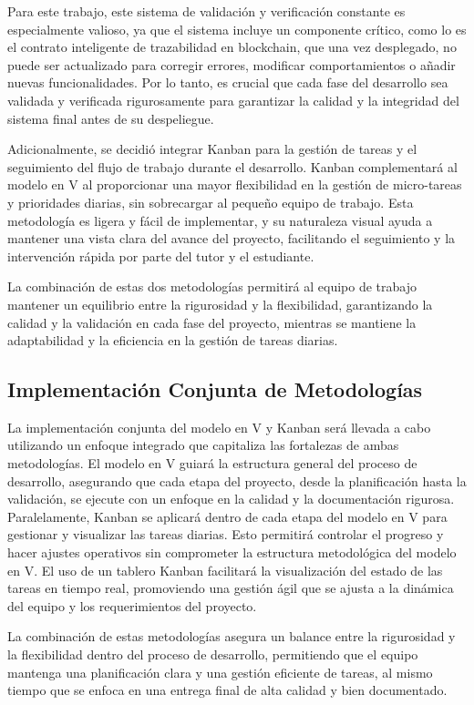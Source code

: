 Para este trabajo, este sistema de validación y verificación constante es especialmente valioso, ya que el sistema incluye un componente crítico, como lo es el contrato inteligente de trazabilidad en blockchain, que una vez desplegado, no puede ser actualizado para corregir errores, modificar comportamientos o añadir nuevas funcionalidades. Por lo tanto, es crucial que cada fase del desarrollo sea validada y verificada rigurosamente para garantizar la calidad y la integridad del sistema final antes de su despeliegue.

Adicionalmente, se decidió integrar Kanban para la gestión de tareas y el seguimiento del flujo de trabajo durante el desarrollo. Kanban complementará al modelo en V al proporcionar una mayor flexibilidad en la gestión de micro-tareas y prioridades diarias, sin sobrecargar al pequeño equipo de trabajo. Esta metodología es ligera y fácil de implementar, y su naturaleza visual ayuda a mantener una vista clara del avance del proyecto, facilitando el seguimiento y la intervención rápida por parte del tutor y el estudiante.

La combinación de estas dos metodologías permitirá al equipo de trabajo mantener un equilibrio entre la rigurosidad y la flexibilidad, garantizando la calidad y la validación en cada fase del proyecto, mientras se mantiene la adaptabilidad y la eficiencia en la gestión de tareas diarias.

\subsection{Implementación Conjunta de Metodologías}

La implementación conjunta del modelo en V y Kanban será llevada a cabo utilizando un enfoque integrado que capitaliza las fortalezas de ambas metodologías. El modelo en V guiará la estructura general del proceso de desarrollo, asegurando que cada etapa del proyecto, desde la planificación hasta la validación, se ejecute con un enfoque en la calidad y la documentación rigurosa. Paralelamente, Kanban se aplicará dentro de cada etapa del modelo en V para gestionar y visualizar las tareas diarias. Esto permitirá controlar el progreso y hacer ajustes operativos sin comprometer la estructura metodológica del modelo en V. El uso de un tablero Kanban facilitará la visualización del estado de las tareas en tiempo real, promoviendo una gestión ágil que se ajusta a la dinámica del equipo y los requerimientos del proyecto.

La combinación de estas metodologías asegura un balance entre la rigurosidad y la flexibilidad dentro del proceso de desarrollo, permitiendo que el equipo mantenga una planificación clara y una gestión eficiente de tareas, al mismo tiempo que se enfoca en una entrega final de alta calidad y bien documentado.

